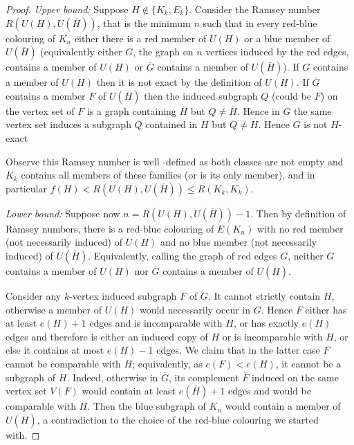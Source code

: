 \documentclass[a4paper,12pt]{article}
\begin{document}
\begin{proof}
\textit{Upper bound:} Suppose $H \notin \{K_k,E_k\}$.  Consider the Ramsey number $R(U(H) , U(\overline{H}) )$, that is the minimum $n$ such that in every red-blue colouring of $K_n$ either there is a red member of $U(H)$ or a blue member of $U(\overline{H})$ (equivalently either $G$, the graph on $n$ vertices induced by the red edges, contains a member of $U(H)$ or $\overline{G}$ contains a member of $U(\overline{H})$).  If $G$ contains a member of $U(H)$ then it is not exact by the definition of $U(H)$. If $\overline{G}$ contains a member $F$ of $U(\overline{H})$  then the induced subgraph $Q$ (could be $F$) on the vertex set of $F$ is a graph containing $\overline{H}$ but $Q \neq \overline{H}$.  Hence in $G$ the same vertex set induces a subgraph  $\overline{Q}$ contained in $H$  but $\overline{Q} \neq H$. Hence $G$ is not $H$-exact

Observe this Ramsey number is well -defined as both classes are not empty and $K_k$ contains all members of these families (or is its only member), and in particular $f(H) < R(U(H) , U(\overline{H}) ) \leq R(K_k , K_k) $.

\medskip

\noindent
\textit{Lower bound:} Suppose now $n = R(U(H), U(\overline{H}))- 1$.  Then by definition of Ramsey numbers, there is a red-blue colouring of $E(K_n)$ with no red member (not necessarily induced)  of $U(H)$ and no blue member (not necessarily induced) of $U(\overline{H})$.
Equivalently, calling the graph of red edges $G$, neither $G$ contains a member of $U(H)$ nor $\overline{G}$ contains a member of $U(\overline{H})$.

Consider any $k$-vertex induced subgraph $F$ of $G$.
It cannot strictly contain $H$, otherwise a member of $U(H)$ would necessarily occur in $G$. Hence $F$ either has at least $e(H) +1$ edges and is incomparable with $H$, or has exactly $e(H)$ edges and therefore is either an induced copy of $H$ or is incomparable with $H$, or else it contains at most $e(H) - 1$ edges.
We claim that in the latter case $F$ cannot be comparable with $H$;
equivalently, as $e(F)<e(H)$, it cannot be a subgraph of $H$.
%
%
Indeed, otherwise in $\overline{G}$, its complement $\overline{F}$ induced on the same vertex set $V(F)$ would contain at least $e(\overline{H}) +1$ edges and would be comparable with $\overline{H}$.
Then the blue subgraph of $K_n$ would contain a member of $U(\overline{H})$, a contradiction to the choice of the red-blue colouring we started with.


\end{proof}
\end{document}
